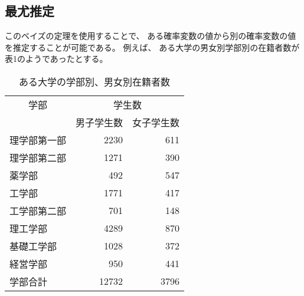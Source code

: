 \documentclass[12pt]{jarticle}
\begin{document}
\subsection{最尤推定}
このベイズの定理を使用することで、
ある確率変数の値から別の確率変数の値を推定することが可能である。
例えば、
ある大学の男女別学部別の在籍者数が表1のようであったとする。

\clearpage
\begin{table}[h]
    \centering
    \caption{ある大学の学部別、男女別在籍者数}
    \begin{tabular}{|l|r|r|} \hline
        \multicolumn{1}{|c|}{学部} & \multicolumn{2}{|c|}{学生数}              \\ \cline{2-3}
                                   & 男子学生数                   & 女子学生数 \\ \hline \hline
        理学部第一部               & 2230                         & 611        \\ \hline
        理学部第二部               & 1271                         & 390        \\ \hline
        薬学部                     & 492                          & 547        \\ \hline
        工学部                     & 1771                         & 417        \\ \hline
        工学部第二部               & 701                          & 148        \\ \hline
        理工学部                   & 4289                         & 870        \\ \hline
        基礎工学部                 & 1028                         & 372        \\ \hline
        経営学部                   & 950                          & 441        \\ \hline
        学部合計                   & 12732                        & 3796       \\ \hline
    \end{tabular}
\end{table}
\end{document}
